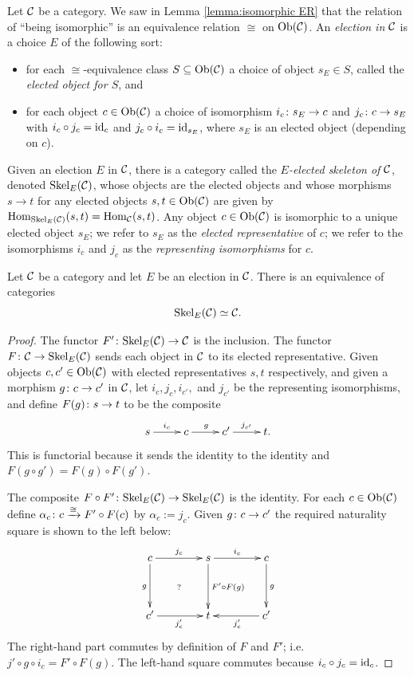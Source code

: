\documentclass[CT4S-EN-RU]{subfiles}
\begin{document}
\begin{definition}[Skeleton]

Let $\mathcal{C}$ be a category. We saw in Lemma \ref{lemma:isomorphic ER} that the relation of “being isomorphic” is an equivalence relation $\cong$ on $\textnormal{Ob}(\mathcal{C})$. An {\em election in $\mathcal{C}$} is a choice $E$ of the following sort:
\begin{itemize}
\item for each $\cong$-equivalence class $S\subseteq\textnormal{Ob}(\mathcal{C})$ a choice of object $s_E\in S$, called the {\em elected object for $S$}, and
\item for each object $c\in\textnormal{Ob}(\mathcal{C})$ a choice of isomorphism $i_c\colon s_E\rightarrow c$ and $j_c\colon c\rightarrow s_E$ with $i_c\circ j_c=\textnormal{id}_c$ and $j_c\circ i_c=\textnormal{id}_{s_E}$, where $s_E$ is an elected object (depending on $c$).
\end{itemize}
Given an election $E$ in $\mathcal{C}$, there is a category called the {\em $E$-elected skeleton of $\mathcal{C}$}, denoted $\textnormal{Skel}_E(\mathcal{C})$, whose objects are the elected objects and whose morphisms $s\to t$ for any elected objects $s,t\in\textnormal{Ob}(\mathcal{C})$ are given by $\textnormal{Hom}_{\textnormal{Skel}_E(\mathcal{C})}(s,t)=\textnormal{Hom}_\mathcal{C}(s,t)$. Any object $c\in\textnormal{Ob}(\mathcal{C})$ is isomorphic to a unique elected object $s_E$; we refer to $s_E$ as the {\em elected representative} of $c$; we refer to the isomorphisms $i_c$ and $j_c$ as the {\em representing isomorphisms} for $c$.

\end{definition}

\begin{proposition}

Let $\mathcal{C}$ be a category and let $E$ be an election in $\mathcal{C}$. There is an equivalence of categories $$\textnormal{Skel}_E(\mathcal{C})\simeq\mathcal{C}.$$

\end{proposition}

\begin{proof}

The functor $F'\colon\textnormal{Skel}_E(\mathcal{C})\rightarrow\mathcal{C}$ is the inclusion. The functor $F\colon\mathcal{C}\rightarrow\textnormal{Skel}_E(\mathcal{C})$ sends each object in $\mathcal{C}$ to its elected representative. Given objects $c,c'\in\textnormal{Ob}(\mathcal{C})$ with elected representatives $s,t$ respectively, and given a morphism $g\colon c\rightarrow c'$ in $\mathcal{C}$, let $i_c,j_c,i_{c'},$ and $j_{c'}$ be the representing isomorphisms, and define $F(g)\colon s\rightarrow t$ to be the composite 
$$\xymatrix{s\ar[r]^{i_c}&c\ar[r]^g&c'\ar[r]^{j_{c'}}&t.}$$
This is functorial because it sends the identity to the identity and $F(g\circ g')=F(g)\circ F(g')$.

The composite $F\circ F'\colon\textnormal{Skel}_E(\mathcal{C})\rightarrow\textnormal{Skel}_E(\mathcal{C})$ is the identity. For each $c\in\textnormal{Ob}(\mathcal{C})$ define $\alpha_c\colon c\xrightarrow{\cong} F'\circ F(c)$ by  $\alpha_c:=j_c$. Given $g\colon c\rightarrow c'$ the required naturality square is shown to the left below:
$$
\xymatrix@=40pt{
c\ar[r]^{j_c}\ar[d]_{g}\ar@{}[dr]|{?}&s\ar[r]^{i_c}\ar[d]^{F'\circ F(g)}&c\ar[d]^g\\
c'\ar[r]_{j_c'}&t&c'\ar[l]^{j_c'}}
$$
The right-hand part commutes by definition of $F$ and $F'$; i.e. $j'\circ g\circ i_c=F'\circ F(g)$. The left-hand square commutes because $i_c\circ j_c=\textnormal{id}_c$.

\end{proof}
\end{document}
